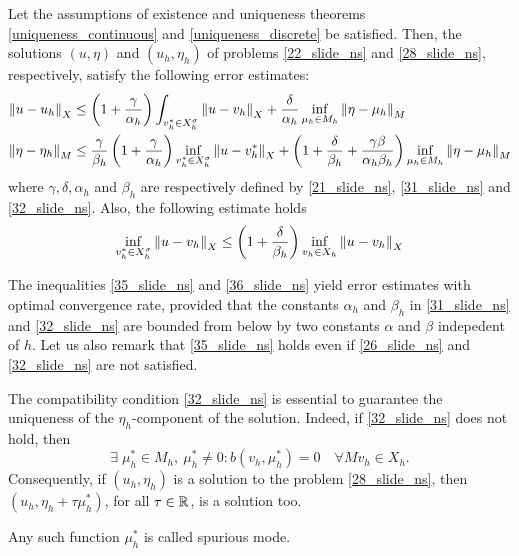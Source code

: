 \begin{theorem}
    Let the assumptions of existence and uniqueness theorems \eqref{uniqueness_continuous} and \eqref{uniqueness_discrete} be satisfied. Then, the solutions \((u,\eta)\) and \((u_h, \eta_h)\) of problems \eqref{22_slide_ns} and \eqref{28_slide_ns}, respectively, satisfy the following error estimates: 
    \begin{align}
        \norm{u-u_h}_X &\leq \left( 1+\frac{\gamma}{\alpha_h} \right)\int_{v_h^* \in X_h^\sigma} \norm{u-v_h}_X + \frac{\delta}{\alpha_h} \inf_{\mu_h \in M_h} \norm{\eta - \mu_h}_M \label{35_slide_ns} \\
            \norm{\eta - \eta_h}_M &\leq \frac{\gamma}{\beta_h} \left( 1+\frac{\gamma}{\alpha_h} \right) \inf_{v^*_h \in X_h^\sigma} \norm{u - v^*_h}_X + \left( 1 + \frac{\delta}{\beta_h} + \frac{\gamma \beta}{\alpha_h \beta_h} \right) \inf_{\mu_h \in M_h} \norm{\eta - \mu_h}_M \label{36_slide_ns}
    \end{align}
    where \(\gamma, \delta, \alpha_h\) and \(\beta_h\) are respectively defined by \eqref{21_slide_ns}, \eqref{31_slide_ns} and \eqref{32_slide_ns}. Also, the following estimate holds
    \begin{equation}
        \inf_{v^*_h \in X_h^\sigma} \norm{u - v_h}_X \leq \left( 1 + \frac{\delta}{\beta_h} \right) \inf_{v_h \in X_h} \norm{u - v_h}_X 
        \label{37_slide_ns}
    \end{equation}
\end{theorem}
The inequalities \eqref{35_slide_ns} and \eqref{36_slide_ns} yield error estimates with optimal convergence rate, provided that the constants \(\alpha_h\) and \(\beta_h\) in \eqref{31_slide_ns} and \eqref{32_slide_ns} are bounded from below by two constants \(\alpha\) and \(\beta\) indepedent of \(h\). Let us also remark that \eqref{35_slide_ns} holds even if \eqref{26_slide_ns} and \eqref{32_slide_ns} are not satisfied. 
\begin{remark}
    The compatibility condition \eqref{32_slide_ns} is essential to guarantee the uniqueness of the \(\eta_h\)-component of the solution. Indeed, if \eqref{32_slide_ns} does not hold, then
    \[
        \exists \; \mu_h^* \in M_h, \ \mu_h^* \neq 0 : b(v_h, \mu_h^*) = 0 \quad \forall M v_h \in X_h.
    \]
    Consequently, if \((u_h, \eta_h)\) is a solution to the problem \eqref{28_slide_ns}, then \((u_h, \eta_h + \tau \mu_h^*)\), for all \(\tau \in \mathbb{R}\), is a solution too.

    Any such function \(\mu^*_h\) is called spurious mode.
    \label{spurious_mode_ns}
\end{remark}
